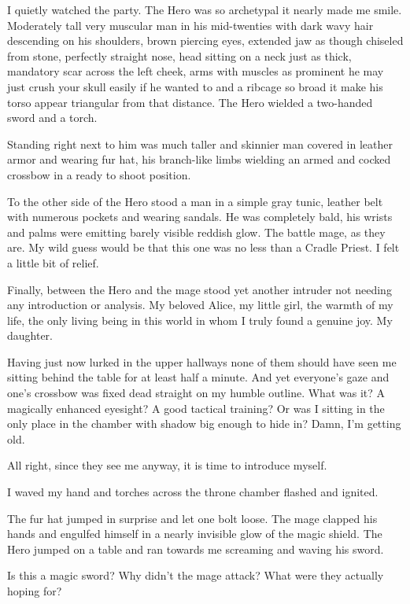 I quietly watched the party. The Hero was so archetypal it nearly made me smile. Moderately tall very muscular man in his mid-twenties with dark wavy hair descending on his shoulders, brown piercing eyes, extended jaw as though chiseled from stone, perfectly straight nose, head sitting on a neck just as thick, mandatory scar across the left cheek, arms with muscles as prominent he may just crush your skull easily if he wanted to and a ribcage so broad it make his torso appear triangular from that distance. The Hero wielded a two-handed sword and a torch.

Standing right next to him was much taller and skinnier man covered in leather armor and wearing fur hat, his branch-like limbs wielding an armed and cocked crossbow in a ready to shoot position.

To the other side of the Hero stood a man in a simple gray tunic, leather belt with numerous pockets and wearing sandals. He was completely bald, his wrists and palms were emitting barely visible reddish glow. The battle mage, as they are. My wild guess would be that this one was no less than a Cradle Priest. I felt a little bit of relief.

Finally, between the Hero and the mage stood yet another intruder not needing any introduction or analysis. My beloved Alice, my little girl, the warmth of my life, the only living being in this world in whom I truly found a genuine joy. My daughter.

Having just now lurked in the upper hallways none of them should have seen me sitting behind the table for at least half a minute. And yet everyone's gaze and one's crossbow was fixed dead straight on my humble outline. What was it? A magically enhanced eyesight? A good tactical training? Or was I sitting in the only place in the chamber with shadow big enough to hide in? Damn, I'm getting old.

All right, since they see me anyway, it is time to introduce myself.

 I waved my hand and torches across the throne chamber flashed and ignited. 

The fur hat jumped in surprise and let one bolt loose. The mage clapped his hands and engulfed himself in a nearly invisible glow of the magic shield. The Hero jumped on a table and ran towards me screaming and waving his sword.

Is this a magic sword? Why didn't the mage attack? What were they actually hoping for?

